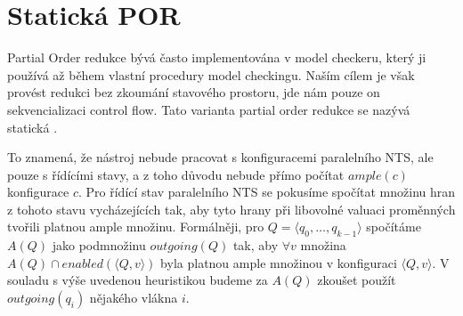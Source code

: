 \documentclass[12pt]{fithesis2}
\newcommand{\tuple}[1]{\langle #1 \rangle}
\begin{document}
\section{Statická POR}
Partial Order redukce bývá často implementována v model checkeru, který ji používá až během vlastní procedury model checkingu. Naším cílem je však provést redukci bez zkoumání stavového prostoru, jde nám pouze on sekvencializaci control flow. Tato varianta partial order redukce se nazývá statická \cite{SPOR}.

To znamená, že nástroj nebude pracovat s konfiguracemi paralelního NTS, ale pouze s řídícími stavy, a z toho důvodu nebude přímo počítat $\mathit{ample}(c)$ konfigurace $c$. Pro řídící stav paralelního NTS se pokusíme spočítat množinu hran z tohoto stavu vycházejících tak, aby tyto hrany při libovolné valuaci proměnných tvořili platnou ample množinu. Formálněji, pro $Q = \tuple{q_{0}, \ldots, q_{k-1}}$ spočítáme $A(Q)$ jako podmnožinu $\mathit{outgoing}(Q)$ tak, aby $\forall v$ množina $A(Q) \cap \mathit{enabled}\left({\tuple{Q, v}}\right)$ byla platnou ample množinou v konfiguraci $\tuple{Q,v}$. V souladu s výše uvedenou heuristikou budeme za $A(Q)$ zkoušet použít $\mathit{outgoing}(q_i)$ nějakého vlákna $i$.
\end{document}

